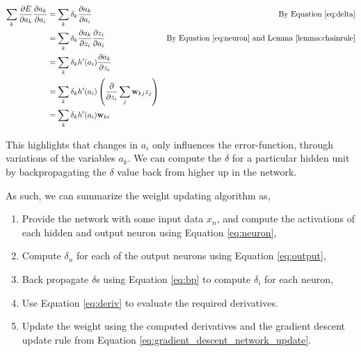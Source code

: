 \begin{align}
    \sum_k \frac{\partial E}{\partial a_k} \frac{\partial a_k}{\partial a_i}
    &= \sum_k \delta_k \frac{\partial a_k}{\partial a_i}
    & \text{By Equation \eqref{eq:delta}}
    \\
    &= \sum_k \delta_k \frac{\partial a_k}{\partial z_i}
        \frac{\partial z_i}{\partial a_i}
    & \text{By Equation \eqref{eq:neuron} and Lemma \ref{lemma:chainrule}}
    \\
    &= \sum_k \delta_k h'(a_i) \frac{\partial a_k}{\partial z_i}
    \\
    &= \sum_k \delta_k h'(a_i) \left( \frac{\partial}{\partial z_i}
        \sum_{j} \mathbf{w}_{kj} z_j\right)
    \\
    &= \sum_k \delta_k h'(a_i) \mathbf{w}_{ki}
    \\
\end{align}

This highlights that changes in $a_i$ only influences the error-function,
through variations of the variables $a_k$. We can compute the $\delta$ for a
particular hidden unit by backpropagating the $\delta$ value back from higher up
in the network.

As such, we can summarize the weight updating algorithm as,

\begin{enumerate}
    \item

        Provide the network with some input data $x_n$, and compute the
        activations of each hidden and output neuron using Equation
        \eqref{eq:neuron},

    \item

        Compute $\delta_n$ for each of the output neurons using Equation
        \eqref{eq:output},

    \item

        Back propagate $\delta$s using Equation \eqref{eq:bp} to compute
        $\delta_i$ for each neuron,

    \item

        Use Equation \eqref{eq:deriv} to evaluate the required derivatives.

    \item

        Update the weight using the computed derivatives
        and the gradient descent update rule from Equation
        \eqref{eq:gradient_descent_network_update}.

\end{enumerate}


